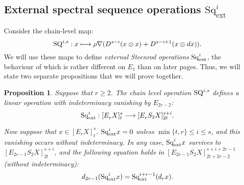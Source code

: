 \documentclass[11pt]{amsart} \renewcommand{\baselinestretch}{1.2}
\theoremstyle{plain}
\newtheorem{prop}[thm]{Proposition}
\numberwithin{equation}{section} %
\theoremstyle{plain}
\newtheorem{prop}[thm]{Proposition}
\numberwithin{equation}{chapter} %
\let\oldphi\phi
\let\phi\varphi
\renewcommand{\to}{\longrightarrow}
\newcommand{\calV}{\mathcal{V}}
\newcommand{\vect}[2]{\calV^{#1}_{#2}}
\newcommand{\Nabla}{\nabla}
\newcommand{\Sq}{\mathrm{Sq}}
\newcommand{\Edownup}[5]{[E_{#1}^{#2}#3]^{#4}_{#5}}
\newcommand{\dhor}{_\mathrm{h}}
\renewcommand{\mapsto}{\longmapsto}
\newcommand{\SubsectionOrSection}[1]{\subsection{#1}}
\begin{document}
\begin{second quadrant homotopy sseq operations}
\SubsectionOrSection{External spectral sequence operations $\Sq_\mathrm{ext}^i$}
\label{External spectral sequence operations Sq}
Consider the chain-level map:
\[\textup{SQ}^{i,s}:x\mapsto \rho\Nabla (D^{s-i}(x\otimes x)+D^{s-i+1}(x\otimes dx)).\]
We will use these maps to define \emph{external Steenrod operations} $\Sq^i_\textup{ext}$, the behaviour of which is rather different on $E_1$ than on later pages. Thus, we will state two separate propositions that we will prove together. 

\begin{prop}
\label{prop on e1 steens 1}
Suppose that  $r\geq2$. The chain level operation $\textup{SQ}^{i,s}$ defines a linear operation  with indeterminacy vanishing by $E_{2r-2}$:
\[\Sq^i_\textup{ext}:\Edownup{r}{}{X}{s}{t}\to \Edownup{r}{}{S_2X}{s+i}{2t}.\]

Now suppose that $x\in\Edownup{r}{}{X}{s}{t}$. $\Sq^i_\textup{ext}x=0$ unless $\min\{t,r\}\leq i\leq s$,  and this vanishing occurs without indeterminacy.
In any case, $\Sq^i_\textup{ext}x$ survives to $\Edownup{2r-1}{}{S_2X}{s+i}{2t}$, and the following equation holds in $\Edownup{2r-1}{}{S_2X}{s+i+2r-1}{2t+2r-2}$ (without indeterminacy): \[d_{2r-1}(\Sq^i_\textup{ext}x)=\Sq^{i+r-1}_\textup{ext}(d_rx).\]


\end{prop}
\end{second quadrant homotopy sseq operations}
\end{document}
